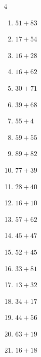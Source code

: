 \begin{multicols}{4}
\begin{enumerate}
  \item $51+83$
        \phantom{$=134$}

  \item $17+54$
        \phantom{$=71$}

  \item $16+28$
        \phantom{$=44$}

  \item $16+62$
        \phantom{$=78$}

  \item $30+71$
        \phantom{$=101$}

  \item $39+68$
        \phantom{$=107$}

  \item $55+4$
        \phantom{$=59$}

  \item $59+55$
        \phantom{$=114$}

  \item $89+82$
        \phantom{$=171$}

  \item $77+39$
        \phantom{$=116$}

  \item $28+40$
        \phantom{$=68$}

  \item $16+10$
        \phantom{$=26$}

  \item $57+62$
        \phantom{$=119$}

  \item $45+47$
        \phantom{$=92$}

  \item $52+45$
        \phantom{$=97$}

  \item $33+81$
        \phantom{$=114$}

  \item $13+32$
        \phantom{$=45$}

  \item $34+17$
        \phantom{$=51$}

  \item $44+56$
        \phantom{$=100$}

  \item $63+19$
        \phantom{$=82$}

  \item $16+18$
        \phantom{$=34$}

\columnbreak %


\end{enumerate}
\end{multicols}
